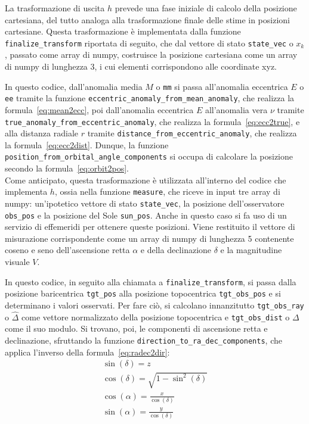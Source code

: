 \documentclass[12pt,a4paper,openright,twoside]{book}
\begin{document}
La trasformazione di uscita $h$ prevede una fase iniziale di calcolo della posizione cartesiana, del tutto analoga alla trasformazione finale delle stime in posizioni cartesiane. Questa trasformazione è implementata dalla funzione \lstinline{finalize_transform} riportata di seguito, che dal vettore di stato \lstinline{state_vec} o $x_k$, passato come array di numpy, costruisce la posizione cartesiana come un array di numpy di lunghezza 3, i cui elementi corrispondono alle coordinate xyz.

In questo codice, dall'anomalia media $M$ o \lstinline{mm} si passa all'anomalia eccentrica $E$ o \lstinline{ee} tramite la funzione \lstinline{eccentric_anomaly_from_mean_anomaly}, che realizza la formula~\ref{eq:mean2ecc}, poi dall'anomalia eccentrica $E$ all'anomalia vera $\nu$ tramite \lstinline{true_anomaly_from_eccentric_anomaly}, che realizza la formula~\ref{eq:ecc2true}, e alla distanza radiale $r$ tramite \lstinline{distance_from_eccentric_anomaly}, che realizza la formula~\ref{eq:ecc2dist}. Dunque, la funzione \lstinline{position_from_orbital_angle_components} si occupa di calcolare la posizione secondo la formula~\ref{eq:orbit2pos}. \\

Come anticipato, questa trasformazione è utilizzata all'interno del codice che implementa $h$, ossia nella funzione \lstinline{measure}, che riceve in input tre array di numpy: un'ipotetico vettore di stato \lstinline{state_vec}, la posizione dell'osservatore \lstinline{obs_pos} e la posizione del Sole \lstinline{sun_pos}. Anche in questo caso si fa uso di un servizio di effemeridi per ottenere queste posizioni. Viene restituito il vettore di misurazione corrispondente come un array di numpy di lunghezza 5 contenente coseno e seno dell'ascensione retta $\alpha$ e della declinazione $\delta$ e la magnitudine visuale $V$.

In questo codice, in seguito alla chiamata a \lstinline{finalize_transform}, si passa dalla posizione baricentrica \lstinline{tgt_pos} alla posizione topocentrica \lstinline{tgt_obs_pos} e si determinano i valori osservati. Per fare ciò, si calcolano innanzitutto \lstinline{tgt_obs_ray} o $\hat{\Delta}$ come vettore normalizzato della posizione topocentrica e \lstinline{tgt_obs_dist} o $\Delta$ come il suo modulo. Si trovano, poi, le componenti di ascensione retta e declinazione, sfruttando la funzione \lstinline{direction_to_ra_dec_components}, che applica l'inverso della formula~\ref{eq:radec2dir}:
\begin{gather}
\sin(\delta)=z \\
\cos(\delta)=\sqrt{1-\sin^2(\delta)} \\
\cos(\alpha)=\frac{x}{\cos(\delta)} \\
\sin(\alpha)=\frac{y}{\cos(\delta)}
\end{gather}
\end{document}

